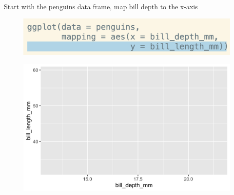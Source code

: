 \documentclass[11pt]{beamer}
\begin{document}
	\begin{frame}
		

		Start with the penguins data frame, map bill depth to the x-axis 
		
		\begin{minipage}[t]{0.5\linewidth}
			\begin{figure}
				\centering
				\includegraphics[width=1\linewidth]{Images/S2/code/s8}
				
			\end{figure}
		\end{minipage}%
		\begin{minipage}[t]{0.5\linewidth}
			
			\begin{figure}
				\centering
				\includegraphics[width=1\linewidth]{Images/S2/penguins-2-1}
				
			\end{figure}
			
			
		\end{minipage}
		
	\end{frame}
\end{document}
